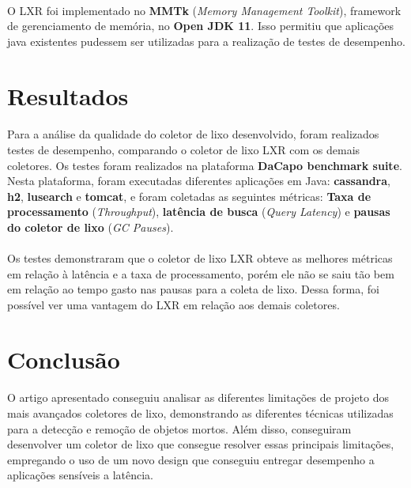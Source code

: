 \documentclass[12pt]{article}
\begin{document}
\paragraph{}O LXR foi implementado no \textbf{MMTk} (\textit{Memory Management Toolkit}), framework de gerenciamento de memória, no \textbf{Open JDK 11}. Isso permitiu que aplicações java existentes pudessem ser utilizadas para a realização de testes de desempenho.

\section{Resultados}

\paragraph{}Para a análise da qualidade do coletor de lixo desenvolvido, foram realizados testes de desempenho, comparando o coletor de lixo LXR com os demais coletores. Os testes foram realizados na plataforma \textbf{DaCapo benchmark suite}. Nesta plataforma, foram executadas diferentes aplicações em Java: \textbf{cassandra}, \textbf{h2}, \textbf{lusearch} e \textbf{tomcat}, e foram coletadas as seguintes métricas: \textbf{Taxa de processamento} (\textit{Throughput}), \textbf{latência de busca} (\textit{Query Latency}) e \textbf{pausas do coletor de lixo} (\textit{GC Pauses}).

\paragraph{}Os testes demonstraram que o coletor de lixo LXR obteve as melhores métricas em relação à latência e a taxa de processamento, porém ele não se saiu tão bem em relação ao tempo gasto nas pausas para a coleta de lixo. Dessa forma, foi possível ver uma vantagem do LXR em relação aos demais coletores.

\section{Conclusão}

\paragraph{}O artigo apresentado conseguiu analisar as diferentes limitações de projeto dos mais avançados coletores de lixo, demonstrando as diferentes técnicas utilizadas para a detecção e remoção de objetos mortos. Além disso, conseguiram desenvolver um coletor de lixo que consegue resolver essas principais limitações, empregando o uso de um novo design que conseguiu entregar desempenho a aplicações sensíveis a latência.




\nocite{10.1145/3519939.3523440}
\end{document}
